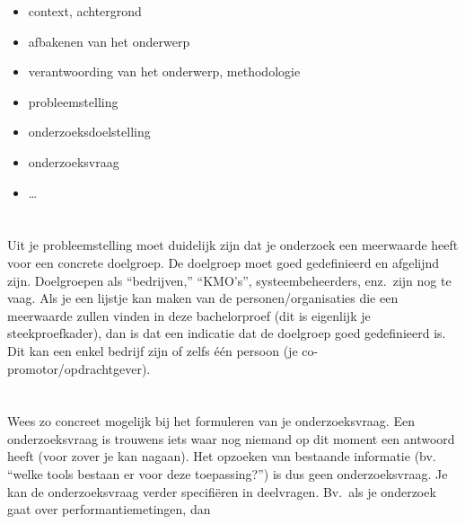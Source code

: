 \begin{itemize}
  \item context, achtergrond
  \item afbakenen van het onderwerp
  \item verantwoording van het onderwerp, methodologie
  \item probleemstelling
  \item onderzoeksdoelstelling
  \item onderzoeksvraag
  \item \ldots
\end{itemize}

\section{}%
\label{sec:probleemstelling}

Uit je probleemstelling moet duidelijk zijn dat je onderzoek een meerwaarde heeft voor een concrete doelgroep. De doelgroep moet goed gedefinieerd en afgelijnd zijn. Doelgroepen als ``bedrijven,'' ``KMO's'', systeembeheerders, enz.~zijn nog te vaag. Als je een lijstje kan maken van de personen/organisaties die een meerwaarde zullen vinden in deze bachelorproef (dit is eigenlijk je steekproefkader), dan is dat een indicatie dat de doelgroep goed gedefinieerd is. Dit kan een enkel bedrijf zijn of zelfs één persoon (je co-promotor/opdrachtgever).

\section{}%
\label{sec:onderzoeksvraag}

Wees zo concreet mogelijk bij het formuleren van je onderzoeksvraag. Een onderzoeksvraag is trouwens iets waar nog niemand op dit moment een antwoord heeft (voor zover je kan nagaan). Het opzoeken van bestaande informatie (bv. ``welke tools bestaan er voor deze toepassing?'') is dus geen onderzoeksvraag. Je kan de onderzoeksvraag verder specifiëren in deelvragen. Bv.~als je onderzoek gaat over performantiemetingen, dan

\section{}%
\label{sec:onderzoeksdoelstelling}

